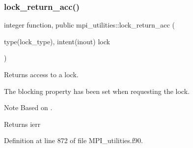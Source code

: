 \subsubsection{\texorpdfstring{lock\+\_\+return\+\_\+acc()}{lock\_return\_acc()}}
{\footnotesize\ttfamily integer function, public mpi\+\_\+utilities\+::lock\+\_\+return\+\_\+acc (\begin{DoxyParamCaption}\item[{type(lock\+\_\+type), intent(inout)}]{lock }\end{DoxyParamCaption})}



Returns access to a lock. 

The blocking property has been set when requesting the lock.

\begin{DoxyNote}{Note}
Based on \cite{RossAtomicIO}.
\end{DoxyNote}
\begin{DoxyReturn}{Returns}
ierr 
\end{DoxyReturn}


Definition at line 872 of file M\+P\+I\+\_\+utilities.\+f90.

